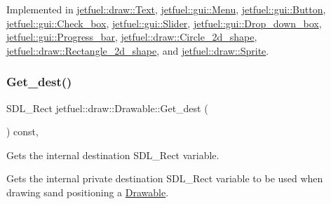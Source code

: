 Implemented in \hyperlink{classjetfuel_1_1draw_1_1Text_ac0b8a614277d6b575c52d127e9a673f2}{jetfuel\+::draw\+::\+Text}, \hyperlink{classjetfuel_1_1gui_1_1Menu_a0355f5ee3060b1ae9d85a5c8cba3795b}{jetfuel\+::gui\+::\+Menu}, \hyperlink{classjetfuel_1_1gui_1_1Button_a1c8ec68b90dc461b1603c47fb8c509c4}{jetfuel\+::gui\+::\+Button}, \hyperlink{classjetfuel_1_1gui_1_1Check__box_ad2ce6d4af8d950a4ef76b0688541c29a}{jetfuel\+::gui\+::\+Check\+\_\+box}, \hyperlink{classjetfuel_1_1gui_1_1Slider_a483038c689276ed8468e990977e5a74a}{jetfuel\+::gui\+::\+Slider}, \hyperlink{classjetfuel_1_1gui_1_1Drop__down__box_a1b62cab3674f45700ad9afd6076a8cb1}{jetfuel\+::gui\+::\+Drop\+\_\+down\+\_\+box}, \hyperlink{classjetfuel_1_1gui_1_1Progress__bar_a91a7ffe82738105be9b36a48dca1cdec}{jetfuel\+::gui\+::\+Progress\+\_\+bar}, \hyperlink{classjetfuel_1_1draw_1_1Circle__2d__shape_a8be660f3cd624dc077d9003ee3b37212}{jetfuel\+::draw\+::\+Circle\+\_\+2d\+\_\+shape}, \hyperlink{classjetfuel_1_1draw_1_1Rectangle__2d__shape_aba19e63d55c824de135932483fe40fcb}{jetfuel\+::draw\+::\+Rectangle\+\_\+2d\+\_\+shape}, and \hyperlink{classjetfuel_1_1draw_1_1Sprite_ae4e52cd12a067e67ed67d5a2a5835143}{jetfuel\+::draw\+::\+Sprite}.

\mbox{\label{classjetfuel_1_1draw_1_1Drawable_a8709fde1dc750d3c6ca5ecb8b9b4fb12}} 
\subsubsection{\texorpdfstring{Get\+\_\+dest()}{Get\_dest()}}
{\footnotesize\ttfamily S\+D\+L\+\_\+\+Rect jetfuel\+::draw\+::\+Drawable\+::\+Get\+\_\+dest (\begin{DoxyParamCaption}{ }\end{DoxyParamCaption}) const\hspace{0.3cm}{\ttfamily [inline]}, {\ttfamily [protected]}}



Gets the internal destination S\+D\+L\+\_\+\+Rect variable. 

Gets the internal private destination S\+D\+L\+\_\+\+Rect variable to be used when drawing sand positioning a \hyperlink{classjetfuel_1_1draw_1_1Drawable}{Drawable}. \mbox{\label{classjetfuel_1_1draw_1_1Drawable_ae7ebd30d66db2c8a5d5371cbcf0023fc}} 
